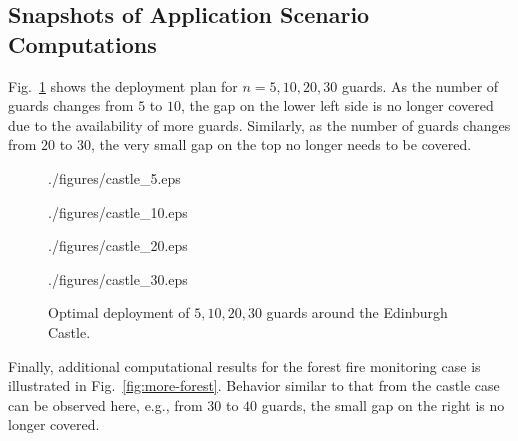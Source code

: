 \subsection{Snapshots of Application Scenario Computations}
Fig.~\ref{fig:more-edinburgh} shows the deployment plan for $n = 5, 10, 20, 
30$ guards. As the number of guards changes from $5$ to $10$, the gap on the
lower left side is no longer covered due to the availability of more guards.
Similarly, as the number of guards changes from $20$ to $30$, the very small 
gap on the top no longer needs to be covered.  

\begin{figure}[ht!]
	\begin{center}
		\begin{overpic}[width={\ifoc 4in \else 2.05in \fi},tics=5]{./figures/castle_5.eps}
		\end{overpic}
    \end{center}
	\begin{center}
		\begin{overpic}[width={\ifoc 4in \else 2.05in \fi},tics=5]{./figures/castle_10.eps}
		\end{overpic}
    \end{center}
	\begin{center}
		\begin{overpic}[width={\ifoc 4in \else 2.05in \fi},tics=5]{./figures/castle_20.eps}
		\end{overpic}
    \end{center}
	\begin{center}
		\begin{overpic}[width={\ifoc 4in \else 2.05in \fi},tics=5]{./figures/castle_30.eps}
		\end{overpic}
	\end{center}
	\vspace*{-2mm}
	\caption{\label{fig:more-edinburgh} Optimal deployment of $5, 10, 20, 30$ 
	guards around the Edinburgh Castle.}
\end{figure}

Finally, additional computational results for the forest fire monitoring
case is illustrated in Fig.~\ref{fig:more-forest}. Behavior similar to that 
from the castle case can be observed here, e.g., from $30$ to $40$ 
guards, the small gap on the right is no longer covered. 

